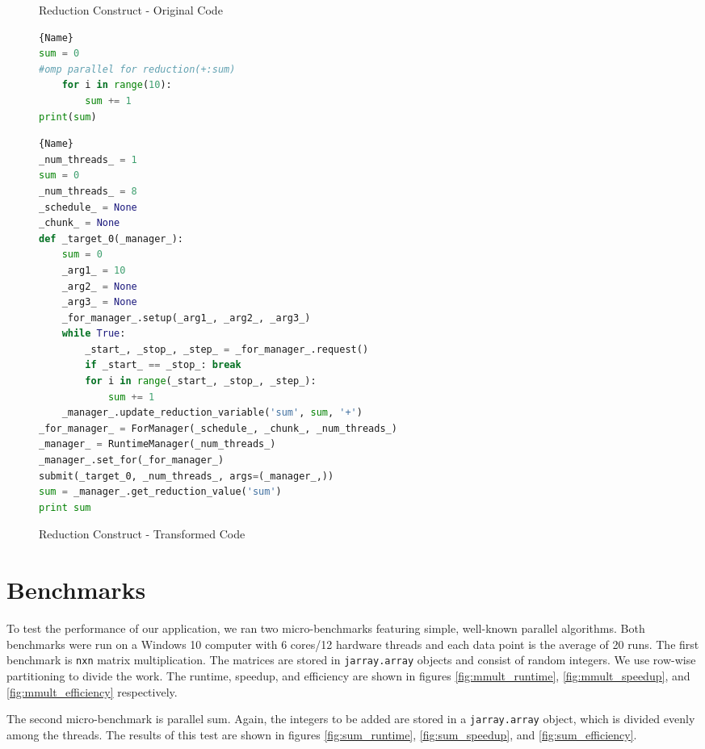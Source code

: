 \documentclass[letterpaper,12pt]{article} %
\begin{document}
\begin{figure}[H]
\caption{Reduction Construct - Original Code}
\label{fig:reduction1}
\begin{lstlisting}[language=Python]{Name}
sum = 0
#omp parallel for reduction(+:sum)
    for i in range(10):
        sum += 1
print(sum)
\end{lstlisting}

\caption{Reduction Construct - Transformed Code}
\label{fig:reduction2}
\begin{lstlisting}[language=Python]{Name}
_num_threads_ = 1
sum = 0
_num_threads_ = 8
_schedule_ = None
_chunk_ = None
def _target_0(_manager_):
    sum = 0
    _arg1_ = 10
    _arg2_ = None
    _arg3_ = None
    _for_manager_.setup(_arg1_, _arg2_, _arg3_)
    while True:
        _start_, _stop_, _step_ = _for_manager_.request()
        if _start_ == _stop_: break
        for i in range(_start_, _stop_, _step_):
            sum += 1
    _manager_.update_reduction_variable('sum', sum, '+')
_for_manager_ = ForManager(_schedule_, _chunk_, _num_threads_)
_manager_ = RuntimeManager(_num_threads_)
_manager_.set_for(_for_manager_)
submit(_target_0, _num_threads_, args=(_manager_,))
sum = _manager_.get_reduction_value('sum')
print sum
\end{lstlisting}
\end{figure}


\section{Benchmarks}
To test the performance of our application, we ran two micro-benchmarks featuring simple, well-known parallel algorithms. Both benchmarks were run on a Windows 10 computer with 6 cores/12 hardware threads and each data point is the average of 20 runs.
The first benchmark is \texttt{nxn} matrix multiplication. The matrices are stored in \texttt{jarray.array} objects and consist of random integers. We use row-wise partitioning to divide the work. The runtime, speedup, and efficiency are shown in figures \ref{fig:mmult_runtime}, \ref{fig:mmult_speedup}, and \ref{fig:mmult_efficiency} respectively. 

The second micro-benchmark is parallel sum. Again, the integers to be added are stored in a \texttt{jarray.array} object, which is divided evenly among the threads. The results of this test are shown in figures \ref{fig:sum_runtime}, \ref{fig:sum_speedup}, and \ref{fig:sum_efficiency}.
\end{document}
